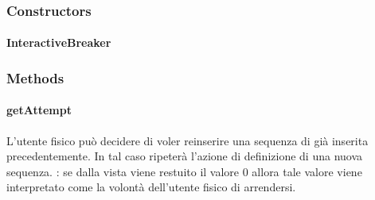 \documentclass[letterpaper,10pt,italian,openany,oneside]{sphinxmanual}
\begin{document}
\subsubsection{Constructors}
\label{\detokenize{source/it/unicam/cs/pa/mastermind/players/InteractiveBreaker:constructors}}

\paragraph{InteractiveBreaker}
\label{\detokenize{source/it/unicam/cs/pa/mastermind/players/InteractiveBreaker:id1}}

\begin{fulllineitems}
\label{\detokenize{source/it/unicam/cs/pa/mastermind/players/InteractiveBreaker:it.unicam.cs.pa.mastermind.players.InteractiveBreaker.InteractiveBreaker(GameView, int)}}
\end{fulllineitems}



\subsubsection{Methods}
\label{\detokenize{source/it/unicam/cs/pa/mastermind/players/InteractiveBreaker:methods}}

\paragraph{getAttempt}
\label{\detokenize{source/it/unicam/cs/pa/mastermind/players/InteractiveBreaker:getattempt}}

\begin{fulllineitems}
\label{\detokenize{source/it/unicam/cs/pa/mastermind/players/InteractiveBreaker:it.unicam.cs.pa.mastermind.players.InteractiveBreaker.getAttempt()}}
L’utente fisico può decidere di voler reinserire una sequenza di  già inserita precedentemente. In tal caso ripeterà l’azione di definizione di una nuova sequenza. : se dalla vista  viene restuito il valore 0 allora tale valore viene interpretato come la volontà dell’utente fisico di arrendersi.

\end{fulllineitems}
\end{document}

